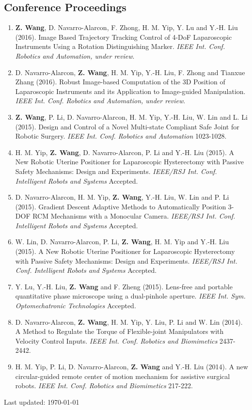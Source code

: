 \documentclass[10pt,letterpaper]{article}
\begin{document}
\subsection*{Conference Proceedings}
\begin{enumerate}
\item \textbf{Z. Wang}, D. Navarro-Alarcon, F. Zhong, H. M. Yip, Y. Lu and Y.-H. Liu (2016).
  Image Based Trajectory Tracking Control of 4-DoF Laparoscopic Instruments Using a Rotation Distinguishing Marker.
  \textit{{IEEE} Int. Conf. Robotics and Automation, under review}.
\item D. Navarro-Alarcon, \textbf{Z. Wang}, H. M. Yip, Y.-H. Liu, F. Zhong and Tianxue Zhang (2016).
  Robust Image-based Computation of the 3D Position of Laparoscopic Instruments and its Application to Image-guided Manipulation.
  \textit{{IEEE} Int. Conf. Robotics and Automation, under review}.
\item \textbf{Z. Wang}, P. Li, D. Navarro-Alarcon, H. M. Yip, Y.-H. Liu, W. Lin and L. Li (2015).
  Design and Control of a Novel Multi-state Compliant Safe Joint for Robotic Surgery.
  \textit{{IEEE} Int. Conf. Robotics and Automation} 1023-1028.
\item H. M. Yip, \textbf{Z. Wang}, D. Navarro-Alarcon, P. Li and Y.-H. Liu (2015).
  A New Robotic Uterine Positioner for Laparoscopic Hysterectomy with Passive Safety Mechanisms: Design and Experiments.
  \textit{{IEEE/RSJ} Int. Conf. Intelligent Robots and Systems} Accepted.
\item D. Navarro-Alarcon, H. M. Yip, \textbf{Z. Wang}, Y.-H. Liu, W. Lin and P. Li (2015).
  Gradient Descent Adaptive Methods to Automatically Position 3-DOF RCM Mechanisms with a Monocular Camera.
  \textit{{IEEE/RSJ} Int. Conf. Intelligent Robots and Systems} Accepted.
\item W. Lin, D. Navarro-Alarcon, P. Li, \textbf{Z. Wang}, H. M. Yip and Y.-H. Liu (2015).
  A New Robotic Uterine Positioner for Laparoscopic Hysterectomy with Passive Safety Mechanisms: Design and Experiments.
  \textit{{IEEE/RSJ} Int. Conf. Intelligent Robots and Systems} Accepted.
\item Y. Lu, Y.-H. Liu, \textbf{Z. Wang} and F. Zheng (2015).
  Lens-free and portable quantitative phase microscope using a dual-pinhole aperture.
  \textit{{IEEE} Int. Sym. Optomechatronic Technologies} Accepted.
\item D. Navarro-Alarcon, \textbf{Z. Wang}, H. M. Yip, Y. Liu, P. Li and W. Lin (2014).
  A Method to Regulate the Torque of Flexible-joint Manipulators with Velocity Control Inputs.
  \textit{{IEEE} Int. Conf. Robotics and Biomimetics} 2437-2442.
\item H. M. Yip, P. Li, D. Navarro-Alarcon, \textbf{Z. Wang} and Y.-H. Liu (2014).
  A new circular-guided remote center of motion mechanism for assistive surgical robots.
  \textit{{IEEE} Int. Conf. Robotics and Biomimetics} 217-222.
\end{enumerate}

\bigskip
{\small Last updated: \today}
\end{document}
